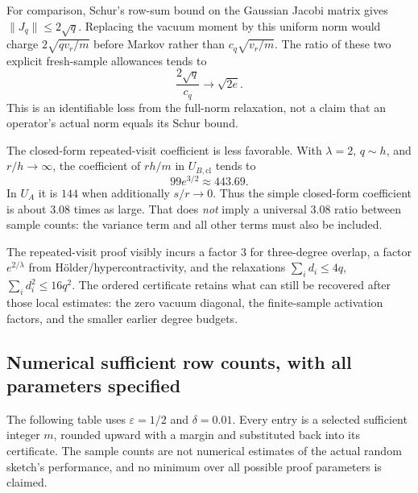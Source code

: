 \documentclass[11pt]{article}
\numberwithin{equation}{section}
\theoremstyle{definition}\newtheorem{definition}[theorem]{Definition}
\theoremstyle{remark}\newtheorem{remark}[theorem]{Remark}
\newcommand{\norm}[1]{\lVert#1\rVert}\newcommand{\ip}[2]{\langle#1,#2\rangle}
\begin{document}
For comparison, Schur's row-sum bound on the Gaussian Jacobi matrix gives
$\norm{J_q}\le2\sqrt q$. Replacing the vacuum moment by this uniform norm would
charge $2\sqrt{qv_r/m}$ before Markov rather than $c_q\sqrt{v_r/m}$.
The ratio of these two explicit fresh-sample allowances tends to
\begin{equation}\label{eq:vacuum-loss}
 \frac{2\sqrt q}{c_q}\longrightarrow\sqrt{2e}.
\end{equation}
This is an identifiable loss from the full-norm relaxation, not a claim that an
operator's actual norm equals its Schur bound.

The closed-form repeated-visit coefficient is less favorable.
With $\lambda=2$, $q\sim h$, and $r/h\to\infty$, the coefficient of $rh/m$ in
$U_{B,\mathrm{cl}}$ tends to
\[
 99e^{3/2}\approx443.69.
\]
In $U_A$ it is $144$ when additionally $s/r\to0$.
Thus the simple closed-form coefficient is about $3.08$ times as large.
That does \emph{not} imply a universal $3.08$ ratio between sample counts:
the variance term and all other terms must also be included.

The repeated-visit proof visibly incurs a factor $3$ for three-degree overlap,
a factor $e^{2/\lambda}$ from H\"older/hypercontractivity, and the relaxations
$\sum_i d_i\le4q$, $\sum_i d_i^2\le16q^2$. The ordered certificate retains what
can still be recovered after those local estimates: the zero vacuum diagonal,
the finite-sample activation factors, and the smaller earlier degree budgets.

\subsection{Numerical sufficient row counts, with all parameters specified}
The following table uses $\varepsilon=1/2$ and $\delta=0.01$.
Every entry is a selected sufficient integer $m$, rounded upward with a margin
and substituted back into its certificate. The sample counts are not numerical
estimates of the actual random sketch's performance, and no minimum over all
possible proof parameters is claimed.
\end{document}
